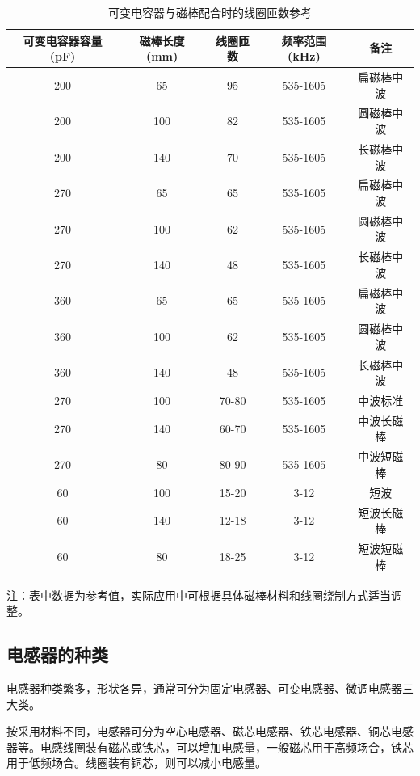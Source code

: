 \documentclass[12pt,UTF8]{ctexbook}
\begin{document}
\begin{table}[htbp]
	\centering
	\caption{可变电容器与磁棒配合时的线圈匝数参考}
	\label{tab:coil_turns}
	\begin{tabular}{|c|c|c|c|c|}
		\hline
		\textbf{可变电容器容量(pF)} & \textbf{磁棒长度(mm)} & \textbf{线圈匝数} & \textbf{频率范围(kHz)} & \textbf{备注} \\
		\hline
		200 & 65 & 95 & 535-1605 & 扁磁棒中波 \\
		\hline
		200 & 100 & 82 & 535-1605 & 圆磁棒中波 \\
		\hline
		200 & 140 & 70 & 535-1605 & 长磁棒中波 \\
		\hline
		270 & 65 & 65 & 535-1605 & 扁磁棒中波 \\
		\hline
		270 & 100 & 62 & 535-1605 & 圆磁棒中波 \\
		\hline
		270 & 140 & 48 & 535-1605 & 长磁棒中波 \\
		\hline
		360 & 65 & 65 & 535-1605 & 扁磁棒中波 \\
		\hline
		360 & 100 & 62 & 535-1605 & 圆磁棒中波 \\
		\hline
		360 & 140 & 48 & 535-1605 & 长磁棒中波 \\
		\hline
		270 & 100 & 70-80 & 535-1605 & 中波标准 \\
		\hline
		270 & 140 & 60-70 & 535-1605 & 中波长磁棒 \\
		\hline
		270 & 80 & 80-90 & 535-1605 & 中波短磁棒 \\
		\hline
		60 & 100 & 15-20 & 3-12 & 短波 \\
		\hline
		60 & 140 & 12-18 & 3-12 & 短波长磁棒 \\
		\hline
		60 & 80 & 18-25 & 3-12 & 短波短磁棒 \\
		\hline
	\end{tabular}
\end{table}

注：表中数据为参考值，实际应用中可根据具体磁棒材料和线圈绕制方式适当调整。

\subsection{电感器的种类}

电感器种类繁多，形状各异，通常可分为固定电感器、可变电感器、微调电感器三大类。

按采用材料不同，电感器可分为空心电感器、磁芯电感器、铁芯电感器、铜芯电感器等。电感线圈装有磁芯或铁芯，可以增加电感量，一般磁芯用于高频场合，铁芯用于低频场合。线圈装有铜芯，则可以减小电感量。
\end{document}
